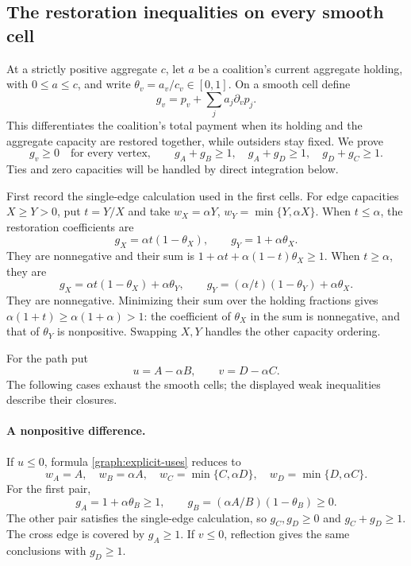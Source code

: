 \documentclass[11pt]{article}
\theoremstyle{definition}\newtheorem{definition}[theorem]{Definition}
\theoremstyle{remark}\newtheorem{remark}[theorem]{Remark}
\begin{document}
\subsection{The restoration inequalities on every smooth cell}

At a strictly positive aggregate $c$, let $a$ be a coalition's current
aggregate holding, with $0\le a\le c$, and write
$\theta_v=a_v/c_v\in[0,1]$. On a smooth cell define
\begin{equation}\label{graph:restoration-coefficients}
 g_v=p_v+\sum_j a_j\partial_v p_j.
\end{equation}
This differentiates the coalition's total payment when its holding and
the aggregate capacity are restored together, while outsiders stay fixed.
We prove
\begin{equation}\label{graph:cover-certificate}
 g_v\ge0\quad\text{for every vertex},\qquad
 g_A+g_B\ge1,\quad g_A+g_D\ge1,\quad g_D+g_C\ge1.
\end{equation}
Ties and zero capacities will be handled by direct integration below.

First record the single-edge calculation used in the first cells. For
edge capacities $X\ge Y>0$, put $t=Y/X$ and take
$w_X=\alpha Y$, $w_Y=\min\{Y,\alpha X\}$.
When $t\le\alpha$, the restoration coefficients are
\[
 g_X=\alpha t(1-\theta_X),\qquad g_Y=1+\alpha\theta_X.
\]
They are nonnegative and their sum is
$1+\alpha t+\alpha(1-t)\theta_X\ge1$.
When $t\ge\alpha$, they are
\[
 g_X=\alpha t(1-\theta_X)+\alpha\theta_Y,\qquad
 g_Y=(\alpha/t)(1-\theta_Y)+\alpha\theta_X.
\]
They are nonnegative. Minimizing their sum over the holding fractions gives
$\alpha(1+t)\ge\alpha(1+\alpha)>1$: the coefficient of $\theta_X$ in
the sum is nonnegative, and that of $\theta_Y$ is nonpositive.
Swapping $X,Y$ handles the other capacity ordering.

For the path put
\[
 u=A-\alpha B,\qquad v=D-\alpha C.
\]
The following cases exhaust the smooth cells; the displayed weak
inequalities describe their closures.

\paragraph{A nonpositive difference.}
If $u\le0$, formula \eqref{graph:explicit-uses} reduces to
\[
 w_A=A,\quad w_B=\alpha A,\quad
 w_C=\min\{C,\alpha D\},\quad w_D=\min\{D,\alpha C\}.
\]
For the first pair,
\[
 g_A=1+\alpha\theta_B\ge1,\qquad
 g_B=(\alpha A/B)(1-\theta_B)\ge0.
\]
The other pair satisfies the single-edge calculation, so $g_C,g_D\ge0$
and $g_C+g_D\ge1$. The cross edge is covered by $g_A\ge1$.
If $v\le0$, reflection gives the same conclusions with $g_D\ge1$.
\end{document}
